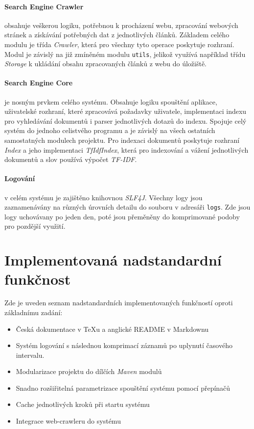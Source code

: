 \documentclass{article}
\begin{document}
\paragraph{Search Engine Crawler} obsahuje veškerou logiku, potřebnou k procházení webu, zpracování webových stránek a získávání potřebných dat z jednotlivých článků. Základem celého modulu je třída \textit{Crawler}, která pro všechny tyto operace poskytuje rozhraní. Modul je závislý na již zmíněném modulu \texttt{utils}, jelikož využívá například třídu \textit{Storage} k ukládání obsahu zpracovaných článků z webu do úložiště.

\paragraph{Search Engine Core} je nosným prvkem celého systému. Obsahuje logiku spouštění aplikace, uživatelské rozhraní, které zpracovává požadavky uživatele, implementaci indexu pro vyhledávání dokumentů i parser jednotlivých dotazů do indexu. Spojuje celý systém do jednoho celistvého programu a je závislý na všech ostatních samostatných modulech projektu. Pro indexaci dokumentů poskytuje rozhraní \textit{Index} a jeho implementaci \textit{TfIdfIndex}, která pro indexování a vážení jednotlivých dokumentů a slov používá výpočet \textit{TF-IDF}.

\paragraph{Logování} v celém systému je zajištěno knihovnou \textit{SLF4J}. Všechny logy jsou zaznamenávány na různých úrovních detailu do souboru v adresáři \texttt{logs}. Zde jsou logy uchovávany po jeden den, poté jsou přeměněny do komprimované podoby pro pozdější využití.

\section{Implementovaná nadstandardní funkčnost}
Zde je uveden seznam nadstandardních implementovaných funkčností oproti základnímu zadání:
\begin{itemize}
    \item Česká dokumentace v TeXu a anglické README v Markdownu 
    \item Systém logování s následnou komprimací záznamů po uplynutí časového intervalu.
    \item Modularizace projektu do dílčích \textit{Maven} modulů
    \item Snadno rozšiřitelná parametrizace spouštění systému pomocí přepínačů
    \item Cache jednotlivých kroků při startu systému
    \item Integrace web-crawleru do systému
\end{itemize}
\end{document}
